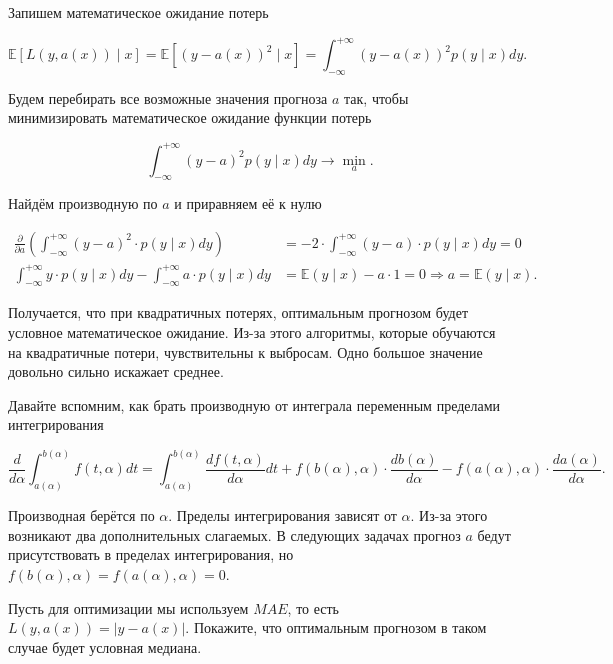\documentclass[12pt,a4paper]{article}
\begin{document}
\begin{esSolution}
Запишем математическое ожидание потерь

\[
\mathbb{E}\left[L(y, a(x)) \mid x \right] = \mathbb{E} \left[ (y - a(x))^2 \mid x \right] = \int_{-\infty}^{+\infty} (y - a(x))^2  p(y \mid x) dy.
\]

Будем перебирать все возможные значения прогноза $a$ так, чтобы минимизировать математическое ожидание функции потерь

\[
\int_{-\infty}^{+\infty} (y - a)^2  p(y \mid x) dy \to \min_{a}.
\]

Найдём производную по $a$ и приравняем её к нулю

\begin{align*}
    \frac{\partial }{\partial a} \left(  \int_{-\infty}^{+\infty} (y - a)^2 \cdot p(y \mid x) dy  \right) &= - 2 \cdot \int_{-\infty}^{+\infty} (y - a) \cdot p(y \mid x) dy = 0 \\ 
    \int_{-\infty}^{+\infty} y \cdot p(y \mid x) dy  - \int_{-\infty}^{+\infty}  a \cdot p(y \mid x) dy  &= \mathbb{E}(y \mid x) - a \cdot 1 =  0 \Rightarrow  a = \mathbb{E}(y \mid x).
\end{align*}

Получается, что при квадратичных потерях, оптимальным прогнозом будет условное математическое ожидание. Из-за этого алгоритмы, которые обучаются на квадратичные потери, чувствительны к выбросам.  Одно большое значение довольно сильно искажает среднее.
\end{esSolution}
 
Давайте вспомним, как брать производную от интеграла переменным пределами интегрирования

\[
\frac{d}{d \alpha} \int_{a(\alpha)}^{b(\alpha)} f(t, \alpha) dt = \int_{a(\alpha)}^{b(\alpha)} \frac{d f (t, \alpha)}{d \alpha}  dt  + f (b(\alpha), \alpha) \cdot \frac{d b(\alpha)}{d \alpha} - f (a(\alpha), \alpha) \cdot \frac{d a(\alpha)}{d \alpha}.
\]

Производная берётся по $\alpha.$ Пределы интегрирования зависят от  $\alpha.$ Из-за этого возникают два дополнительных слагаемых. В следующих задачах прогноз $a$ бедут присутствовать в пределах интегрирования, но $f(b(\alpha), \alpha) = f(a(\alpha), \alpha) = 0.$
 
\begin{vkProblem}
    Пусть для оптимизации мы используем $MAE$, то есть $L(y, a(x)) = |y - a(x)|.$ Покажите, что оптимальным прогнозом в таком случае будет условная медиана.
\end{vkProblem}
\end{document}
